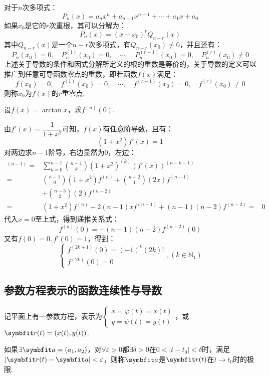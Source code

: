 对于$n$次多项式：
\[P_n(x) = a_n x^n + a_{n-1} x^{n-1} + \cdots + a_1 x + a_0\]
如果$x_0$是它的$r$次重根，其可以分解为：
\[P_n(x) = (x-x_0)^r Q_{n-r}(x)\]
其中$Q_{n-r}(x)$是一个$n-r$次多项式，有$Q_{n-r}(x_0) \neq 0$，并且还有：
\[P_n(x_0) = 0,\quad P^{(1)}_n(x_0) = 0,\quad \cdots,\quad P^{(r-1)}_n(x_0) = 0,\quad P^{(r)}_n(x_0) \neq 0\]
上述关于导数的条件和因式分解所定义的根的重数是等价的，关于导数的定义可以推广到任意可导函数零点的重数，即若函数$f(x)$满足：
\[f(x_0) = 0,\quad f^{(1)}(x_0) = 0,\quad \cdots,\quad f^{(r-1)}(x_0) = 0,\quad f^{(r)}(x_0) \neq 0\]
则称$x_0$为$f(x)$的$r$重零点.

\begin{question}
    设$f(x)=\arctan x$，求$f^{(n)}(0)$.
\end{question}

\begin{solution}
    由$f'(x)=\dfrac{1}{1+x^2}$可知，$f(x)$有任意阶导数，且有：
    \[(1+x^2)f'(x)=1\]
    对两边求$n-1$阶导，右边显然为$0$，左边：
    \begin{align*}
        [(1+x^2)f'(x)]^{(n-1)} =& \sum_{k=0}^{n-1}\binom{n-1}{k}(1+x^2)^{(k)}(f'(x))^{(n-k-1)}\\
        =& \binom{n-1}{0}(1+x^2)f^{(n)} + \binom{n-2}{1}(2x)f^{(n-1)}\\
        &+ \binom{n-3}{2}(2)f^{(n-2)}\\
        =& (1+x^2)f^{(n)}+2(n-1)xf^{(n-1)} + (n-1)(n-2)f^{(n-2)}
        =& 0
    \end{align*}
    代入$x=0$至上式，得到递推关系式：
    \[f^{(n)}(0) = -(n-1)(n-2)f^{(n-2)}(0)\]
    又有$f(0) = 0,f'(0) = 1$，得到：
    \[\begin{cases}
        f^{(2k+1)}(0) = (-1)^k (2k)!\\
        f^{(2k)}(0) = 0
    \end{cases},(k \in \mathbb{N}_1)\]
\end{solution}


\subsection{参数方程表示的函数连续性与导数}
记平面上有一参数方程，表示为$\begin{cases}
    x = \varphi(t) = x(t) \\
    y = \psi(t) = y(t)
\end{cases}$，或$\vb{r}(t) = (x(t),y(t))$.
\begin{definition}
    如果$\exists \vb{a}=(a_1,a_2)$，对$\forall \varepsilon>0$都$\exists \delta > 0$在$0<|t-t_0|<\delta$时，满足$|\vb{r}(t)-\vb{a}|<\varepsilon$，则称$\vb{a}$是$\vb{r}(t)$在$t\to t_0$时的极限.
\end{definition}

